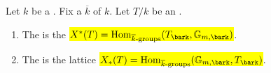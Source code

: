 \begin{definition} \label{definition:character_lattice_of_a_torus_over_a_field}
Let $k$ be a . Fix a  $\overline{k}$ of $k$. Let $T/k$ be an . 
\begin{enumerate}
  \item The  is the  \hl{$X^\ast(T) = \mathrm{Hom}_{\overline{k}\text{-groups}}(T_{\bark},\mathbb{G}_{m,\bark})$}.
  \item The  is the lattice \hl{$X_\ast(T) = \mathrm{Hom}_{\overline{k}\text{-groups}}(\mathbb{G}_{m,\bark}, T_{\bark})$}.
\end{enumerate}
\end{definition}